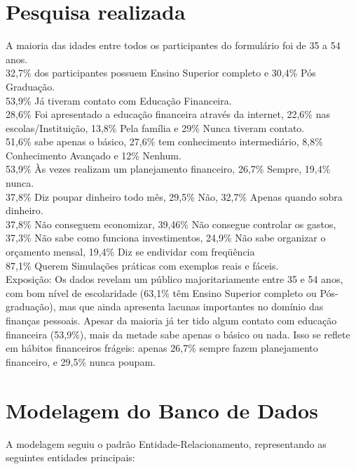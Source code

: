\documentclass[
	article,			%
	12pt,				%
	oneside,			%
	a4paper,			%
	english,			%
	brazil,				%
	sumario=tradicional
	]{abntex2}
\begin{document}
\newpage
\begin{apendicesenv}

\chapter{Pesquisa realizada}
    A maioria das idades entre todos os participantes do formulário foi de 35 a 54 anos.\\ 
    32,7\%  dos participantes possuem Ensino Superior completo e 30,4\% Pós Graduação. \\
    53,9\%  Já tiveram contato com Educação Financeira. \\
    28,6\%  Foi apresentado a educação financeira através da internet, 22,6\% nas escolas/Instituição, 13,8\% Pela família e 29\% Nunca tiveram contato. \\
    51,6\%  sabe apenas o básico, 27,6\% tem conhecimento intermediário, 8,8\% Conhecimento  Avançado e 12\% Nenhum. \\
    53,9\% Às vezes realizam um planejamento financeiro, 26,7\% Sempre, 19,4\% nunca. \\
    37,8\% Diz poupar dinheiro todo mês, 29,5\% Não, 32,7\% Apenas quando sobra dinheiro. \\
    37,8\% Não conseguem economizar, 39,46\% Não consegue controlar os gastos, 37,3\% Não sabe como funciona investimentos, 24,9\% Não sabe organizar o orçamento mensal,  19,4\% Diz se endividar com freqüência \\
    87,1\% Querem Simulações práticas com exemplos reais e fáceis. \\
    Exposição: 
    Os dados revelam um público majoritariamente entre 35 e 54 anos, com bom nível de  escolaridade (63,1\% têm Ensino Superior completo ou Pós-graduação), mas que ainda apresenta lacunas importantes no domínio das finanças pessoais. Apesar da maioria já ter tido algum contato com educação financeira (53,9\%), mais da metade sabe apenas o básico ou nada. Isso se reflete em hábitos financeiros frágeis: apenas 26,7\% sempre fazem planejamento financeiro, e 29,5\% nunca poupam. 
\newpage
\chapter{Modelagem do Banco de Dados}
A modelagem seguiu o padrão Entidade-Relacionamento, representando as seguintes entidades principais:


\end{apendicesenv}
\end{document}
